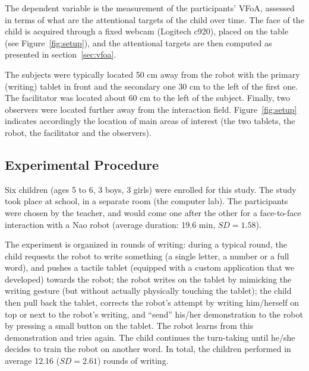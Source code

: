 \documentclass{sig-alternate}
\begin{document}
The dependent variable is the measurement of the participants' VFoA, assessed in
terms of what are the attentional targets of the child over time. The face of the child
is acquired through a fixed webcam (Logitech {\sf c920}), placed on the table
(see Figure~\ref{fig:setup}), and the attentional targets are then computed as
presented in section~\ref{sec:vfoa}.


The subjects were typically located 50 cm away from the robot with the primary
(writing) tablet in front and the secondary one 30 cm to the left of the first
one.  The facilitator was located about 60 cm to the left of the subject.
Finally, two observers were located further away from the interaction field.
Figure~\ref{fig:setup} indicates accordingly the location of main areas of
interest (the two tablets, the robot, the facilitator and the observers).

\subsection{Experimental Procedure}

Six children (ages 5 to 6, 3 boys, 3 girls) were enrolled for this study.
The study took place at school, in a separate room (the computer
lab). The participants were chosen by the teacher, and would come one after the
other for a face-to-face interaction with a {\sc Nao} robot (average duration:
19.6 min, $SD=1.58$).

The experiment is organized in rounds of writing: during a typical round, the
child requests the robot to write something (a single letter, a number or a full
word), and pushes a tactile tablet (equipped with a custom application that we
developed) towards the robot; the robot writes on the tablet by mimicking the
writing gesture (but without actually physically touching the tablet); the child
then pull back the tablet, corrects the robot's attempt by writing him/herself
on top or next to the robot's writing, and ``send'' his/her demonstration to the
robot by pressing a small button on the tablet. The robot learns from this
demonstration and tries again. The child continues the turn-taking until he/she
decides to train the robot on another word. In total, the children performed in
average 12.16 ($SD=2.61$) rounds of writing.
\end{document}
